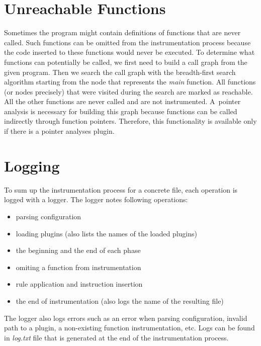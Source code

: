 \section{Unreachable Functions}

Sometimes the program might contain definitions of functions that are never
called. Such functions can be omitted from the instrumentation process because
the code inserted to these functions would never be executed. To determine what
functions can potentially be called, we first need to build a call graph from
the given program. Then we search the call graph with the breadth-first search
algorithm starting from the node that represents the \emph{main} function. All
functions (or nodes precisely) that were visited during the search are marked
as reachable. All the other functions are never called and are not
instrumented. A~pointer analysis is necessary for building this graph because
functions can be called indirectly through function pointers. Therefore, this
functionality is available only if there is a pointer analyses plugin.

\section{Logging}

To sum up the instrumentation process for a concrete file, each operation is
logged with a logger. The logger notes following operations:
\begin{itemize}
  \item parsing configuration
  \item loading plugins (also lists the names of the loaded plugins)
  \item the beginning and the end of each phase
  \item omiting a function from instrumentation
  \item rule application and instruction insertion
  \item the end of instrumentation (also logs the name of the resulting file)
\end{itemize}
The logger also logs errors such as an error when parsing configuration,
invalid path to a plugin, a non-existing function instrumentation, etc. Logs
can be found in \emph{log.txt} file that is generated at the end of the
instrumentation process.


